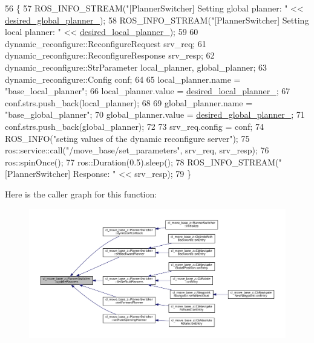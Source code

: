 \begin{DoxyCode}
56 \{
57   ROS\_INFO\_STREAM(\textcolor{stringliteral}{"[PlannerSwitcher] Setting global planner: "} << 
      \hyperlink{classcl__move__base__z_1_1PlannerSwitcher_aef047d3778b2993c1df146bbad43e03d}{desired\_global\_planner\_});
58   ROS\_INFO\_STREAM(\textcolor{stringliteral}{"[PlannerSwitcher] Setting local planner: "} << 
      \hyperlink{classcl__move__base__z_1_1PlannerSwitcher_a6cbf65f11bb69125f913caaabdf7b4cf}{desired\_local\_planner\_});
59 
60   dynamic\_reconfigure::ReconfigureRequest srv\_req;
61   dynamic\_reconfigure::ReconfigureResponse srv\_resp;
62   dynamic\_reconfigure::StrParameter local\_planner, global\_planner;
63   dynamic\_reconfigure::Config conf;
64 
65   local\_planner.name = \textcolor{stringliteral}{"base\_local\_planner"};
66   local\_planner.value = \hyperlink{classcl__move__base__z_1_1PlannerSwitcher_a6cbf65f11bb69125f913caaabdf7b4cf}{desired\_local\_planner\_};
67   conf.strs.push\_back(local\_planner);
68 
69   global\_planner.name = \textcolor{stringliteral}{"base\_global\_planner"};
70   global\_planner.value = \hyperlink{classcl__move__base__z_1_1PlannerSwitcher_aef047d3778b2993c1df146bbad43e03d}{desired\_global\_planner\_};
71   conf.strs.push\_back(global\_planner);
72 
73   srv\_req.config = conf;
74   ROS\_INFO(\textcolor{stringliteral}{"seting values of the dynamic reconfigure server"});
75   ros::service::call(\textcolor{stringliteral}{"/move\_base/set\_parameters"}, srv\_req, srv\_resp);
76   ros::spinOnce();
77   ros::Duration(0.5).sleep();
78   ROS\_INFO\_STREAM(\textcolor{stringliteral}{"[PlannerSwitcher] Response: "} << srv\_resp);
79 \}
\end{DoxyCode}
Here is the caller graph for this function\+:
\nopagebreak
\begin{figure}[H]
\begin{center}
\leavevmode
\includegraphics[width=350pt]{classcl__move__base__z_1_1PlannerSwitcher_a146641f63aea3185daab4c5cbb789550_icgraph}
\end{center}
\end{figure}


